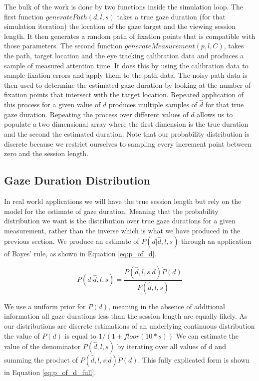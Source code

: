 \documentclass[12pt,a4paper]{article}
\numberwithin{equation}{section}
\begin{document}
The bulk of the work is done by two functions inside the simulation loop. The first function
$generatePath(d,l,s)$ takes a true gaze duration (for that simulation iteration) the location
of the gaze target and the viewing session length. It then
generates a random path of fixation points that is compatible with those parameters.
The second function 
$generateMeasurement(p,l,C)$, takes the path, target location and the eye tracking calibration 
data and produces a sample of measured attention time. It does this by using the calibration data to sample
fixation errors and apply them to the path data. The noisy path data is then used to determine
the estimated gaze duration by looking at the number of fixation points that intersect with the target
location.
Repeated application of this process for a given value of $d$ produces multiple samples of $\hat{d}$
for that true gaze duration. Repeating the process over different 
values of $d$ allows us to populate a two dimensional array where the first dimension is the
true duration and the second the estimated duration. Note that our probability distribution is discrete
because we restrict ourselves to sampling every increment point between zero and the session length.

\subsection{Gaze Duration Distribution}

In real world applications we will have the true session length but rely on the model for the 
estimate of gaze duration. Meaning that the probability distribution we want is the distribution 
over true gaze durations for a given measurement, rather than the inverse which is what we 
have produced in the previous section. We produce an estimate of $P(d|\hat{d},l,s)$
through an application of Bayes' rule, as shown in Equation \ref{eq:p_of_d}.

\begin{equation}
\label{eq:p_of_d}
P(d|\hat{d},l,s) =  \frac{ P(\hat{d},l,s|d) \dot P(d) }{ P(\hat{d},l,s)  }
\end{equation}

We use a uniform prior for $P(d)$, meaning in the absence of additional information all
gaze durations less than the session length are equally likely. As our distributions are
discrete estimations of an underlying continuous distribution the value of $P(d)$ is
equal to $1/(1+floor(10*s))$
 We can estimate the value
of the denominator $P(\hat{d},l,s)$ by iterating over all values of d and summing the product
of $ P(\hat{d},l,s|d) \dot P(d)$. This fully explicated form is shown in 
Equation \ref{eq:p_of_d_full}.
\end{document}
